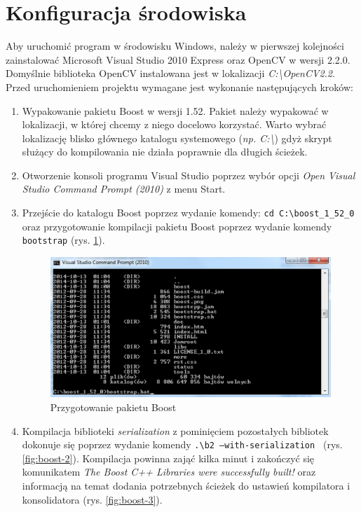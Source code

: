 \section{Konfiguracja środowiska}
Aby uruchomić program w środowisku Windows, należy w pierwszej kolejności zainstalować Microsoft Visual Studio 2010 Express oraz OpenCV w wersji 2.2.0. Domyślnie biblioteka OpenCV instalowana jest w lokalizacji \emph{C:\textbackslash OpenCV2.2}. Przed uruchomieniem projektu wymagane jest wykonanie następujących kroków:
\begin{enumerate}
  \item Wypakowanie pakietu Boost w wersji 1.52. Pakiet należy wypakować w lokalizacji, w której chcemy z niego docelowo korzystać. Warto wybrać lokalizację blisko głównego katalogu systemowego (\emph{np. C:\textbackslash}) gdyż skrypt służący do kompilowania nie działa poprawnie dla długich ścieżek.
  \item Otworzenie konsoli programu Visual Studio poprzez wybór opcji \emph{Open Visual Studio Command Prompt (2010)} z menu Start.
  \item Przejście do katalogu Boost poprzez wydanie komendy: \texttt{cd C:\textbackslash boost\_1\_52\_0} oraz przygotowanie kompilacji pakietu Boost poprzez wydanie komendy \texttt{bootstrap} (rys. \ref{fig:boost-1}).
  
  \begin{figure}[h]
		\centering
		\includegraphics[scale=0.85]{graphics/03_implementacja/boost-1.pdf}
		\caption{ Przygotowanie pakietu Boost }
		\label{fig:boost-1}
	\end{figure}

  \item Kompilacja biblioteki \emph{serialization} z pominięciem pozostałych bibliotek dokonuje się poprzez wydanie komendy \texttt{.\textbackslash b2 --with-serialization } (rys. \ref{fig:boost-2}). Kompilacja powinna zająć kilka minut i zakończyć się komunikatem \emph{The Boost C++ Libraries were successfully built!} oraz informacją na temat dodania potrzebnych ścieżek do ustawień kompilatora i konsolidatora (rys. \ref{fig:boost-3}).
  

\end{enumerate}
